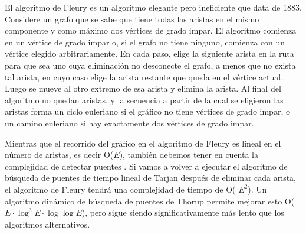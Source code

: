 El algoritmo de Fleury es un algoritmo elegante pero ineficiente que data de 1883. Considere un grafo que se sabe que tiene todas las aristas en el mismo componente y como máximo dos vértices de grado impar. El algoritmo comienza en un vértice de grado impar o, si el grafo no tiene ninguno, comienza con un vértice elegido arbitrariamente. En cada paso, elige la siguiente arista en la ruta para que sea uno cuya eliminación no desconecte el grafo, a menos que no exista tal arista, en cuyo caso elige la arista restante que queda en el vértice actual. Luego se mueve al otro extremo de esa arista y elimina la arista. Al final del algoritmo no quedan aristas, y la secuencia a partir de la cual se eligieron las aristas forma un ciclo euleriano si el gráfico no tiene vértices de grado impar, o un camino euleriano si hay exactamente dos vértices de grado impar.

Mientras que el recorrido del gráfico en el algoritmo de Fleury es lineal en el número de aristas, es decir O($E$), también debemos tener en cuenta la complejidad de detectar puentes . Si vamos a volver a ejecutar el algoritmo de búsqueda de puentes de tiempo lineal de Tarjan después de eliminar cada arista, el algoritmo de Fleury tendrá una complejidad de tiempo de O( $E ^{2}$). Un algoritmo dinámico de búsqueda de puentes de Thorup permite mejorar esto O($E\cdot \log ^{3}E\cdot \log \log E$), pero sigue siendo significativamente más lento que los algoritmos alternativos.